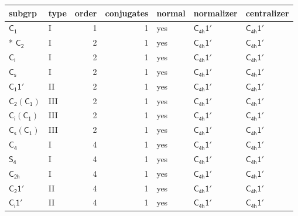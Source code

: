 \documentclass[10pt,a4paper]{article}
\numberwithin{equation}{section}
\newcommand{\grp}[1]{\mathsf{#1}}
\begin{document}
{\small\begin{longtable}{@{}llrrlll@{}}\toprule
subgrp & type & order & conjugates & normal & normalizer & centralizer\\\midrule\endhead
\bottomrule\endfoot\endlastfoot
\href{../../../rotation/data/pdf/C1.pdf}{$\grp{C_{1}}$} & I & 1 & 1 & yes & \href{C4h-1p.pdf}{$\grp{C_{4h}1'}$} & \href{C4h-1p.pdf}{$\grp{C_{4h}1'}$}\\*
\href{../../../rotation/data/pdf/C2.pdf}{$\grp{C_{2}}$} & I & 2 & 1 & yes & \href{C4h-1p.pdf}{$\grp{C_{4h}1'}$} & \href{C4h-1p.pdf}{$\grp{C_{4h}1'}$}\\
\href{../../../rotation/data/pdf/S2.pdf}{$\grp{C_{i}}$} & I & 2 & 1 & yes & \href{C4h-1p.pdf}{$\grp{C_{4h}1'}$} & \href{C4h-1p.pdf}{$\grp{C_{4h}1'}$}\\
\href{../../../rotation/data/pdf/C1v.pdf}{$\grp{C_{s}}$} & I & 2 & 1 & yes & \href{C4h-1p.pdf}{$\grp{C_{4h}1'}$} & \href{C4h-1p.pdf}{$\grp{C_{4h}1'}$}\\
\href{C1-1p.pdf}{$\grp{C_{1}1'}$} & II & 2 & 1 & yes & \href{C4h-1p.pdf}{$\grp{C_{4h}1'}$} & \href{C4h-1p.pdf}{$\grp{C_{4h}1'}$}\\
\href{C2-C1.pdf}{$\grp{C_{2}}(\grp{C_{1}})$} & III & 2 & 1 & yes & \href{C4h-1p.pdf}{$\grp{C_{4h}1'}$} & \href{C4h-1p.pdf}{$\grp{C_{4h}1'}$}\\
\href{S2-C1.pdf}{$\grp{C_{i}}(\grp{C_{1}})$} & III & 2 & 1 & yes & \href{C4h-1p.pdf}{$\grp{C_{4h}1'}$} & \href{C4h-1p.pdf}{$\grp{C_{4h}1'}$}\\
\href{C1v-C1.pdf}{$\grp{C_{s}}(\grp{C_{1}})$} & III & 2 & 1 & yes & \href{C4h-1p.pdf}{$\grp{C_{4h}1'}$} & \href{C4h-1p.pdf}{$\grp{C_{4h}1'}$}\\
\href{../../../rotation/data/pdf/C4.pdf}{$\grp{C_{4}}$} & I & 4 & 1 & yes & \href{C4h-1p.pdf}{$\grp{C_{4h}1'}$} & \href{C4h-1p.pdf}{$\grp{C_{4h}1'}$}\\
\href{../../../rotation/data/pdf/S4.pdf}{$\grp{S_{4}}$} & I & 4 & 1 & yes & \href{C4h-1p.pdf}{$\grp{C_{4h}1'}$} & \href{C4h-1p.pdf}{$\grp{C_{4h}1'}$}\\
\href{../../../rotation/data/pdf/C2h.pdf}{$\grp{C_{2h}}$} & I & 4 & 1 & yes & \href{C4h-1p.pdf}{$\grp{C_{4h}1'}$} & \href{C4h-1p.pdf}{$\grp{C_{4h}1'}$}\\
\href{C2-1p.pdf}{$\grp{C_{2}1'}$} & II & 4 & 1 & yes & \href{C4h-1p.pdf}{$\grp{C_{4h}1'}$} & \href{C4h-1p.pdf}{$\grp{C_{4h}1'}$}\\
\href{S2-1p.pdf}{$\grp{C_{i}1'}$} & II & 4 & 1 & yes & \href{C4h-1p.pdf}{$\grp{C_{4h}1'}$} & \href{C4h-1p.pdf}{$\grp{C_{4h}1'}$}\\

\end{longtable}}
\end{document}
